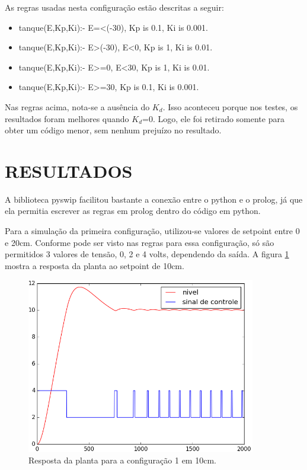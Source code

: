 \documentclass[a4paper,12pt]{article}
\begin{document}
As regras usadas nesta configuração estão descritas a seguir:

\begin{itemize}
\item tanque(E,Kp,Ki):- E=<(-30), Kp is 0.1, Ki is 0.001.
\item tanque(E,Kp,Ki):- E>(-30), E<0, Kp is 1, Ki is 0.01.
\item tanque(E,Kp,Ki):- E>=0, E<30, Kp is 1, Ki is 0.01.
\item tanque(E,Kp,Ki):- E>=30, Kp is 0.1, Ki is 0.001.
\end{itemize}

Nas regras acima, nota-se a ausência do $K_d$. Isso aconteceu porque nos testes, os resultados foram melhores quando $K_d$=0. Logo, ele foi retirado somente para obter um código menor, sem nenhum prejuízo no resultado.


\newpage


\thispagestyle{main}

\section{RESULTADOS}

A biblioteca pyswip facilitou bastante a conexão entre o python e o prolog, já que ela permitia escrever as regras em prolog dentro do código em python.

Para a simulação da primeira configuração, utilizou-se valores de setpoint entre 0 e 20cm. Conforme pode ser visto nas regras para essa configuração, só são permitidos 3 valores de tensão, 0, 2 e 4 volts, dependendo da saída. A figura \ref{10cm} mostra a resposta da planta ao setpoint de 10cm.

\begin{figure}[ht!]
\caption{Resposta da planta para a configuração 1 em 10cm. \label{10cm}}
\centering
\includegraphics[width=100mm]{Imagens/figure_1_HISTERESE.png}
\end{figure}
\end{document}
